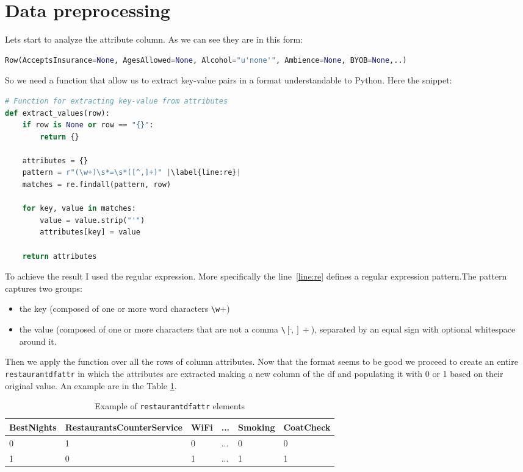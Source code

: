 \documentclass[12pt,english]{report}
\begin{document}
\section{Data preprocessing}
Lets start to analyze the attribute column. As we can see they are in this form:
\begin{lstlisting}[language={Python},label={lst:attritemex},caption={Attributes item example}]
Row(AcceptsInsurance=None, AgesAllowed=None, Alcohol="u'none'", Ambience=None, BYOB=None,..)
\end{lstlisting}
So we need a function that allow us to extract key-value pairs in a format understandable to Python. Here the snippet:
\begin{lstlisting}[language={Python},escapechar=|,label={lst:extractvalue},caption={Extracting key-value from attributes}]
# Function for extracting key-value from attributes
def extract_values(row):
    if row is None or row == "{}":
        return {}
    
    attributes = {}
    pattern = r"(\w+)\s*=\s*([^,]+)" |\label{line:re}|
    matches = re.findall(pattern, row)
    
    for key, value in matches:
        value = value.strip("'")
        attributes[key] = value
    
    return attributes
\end{lstlisting}
To achieve the result I used the regular expression. More specifically the line~\ref{line:re} defines a regular expression pattern.The pattern captures two groups:
\begin{itemize}
 \item the key (composed of one or more word characters \texttt{\textbackslash w$+$})
 \item the value (composed of one or more characters that are not a comma \texttt{\textbackslash $[\hat,]+$}), separated by an equal sign with optional whitespace around it.
 \end{itemize} 
Then we apply the function over all the rows of column attributes.
Now that the format seems to be good we proceed to create an entire \texttt{restaurant\textunderscore df\textunderscore attr} in which the attributes are extracted making a new column of the df and populating it with 0 or 1 based on their original value. An example are in the Table \ref{tab:restattrtable}.
\\
\begin{table}[]
\caption{Example of \texttt{restaurant\textunderscore df\textunderscore attr} elements} 
\label{tab:restattrtable}
\begin{tabular}{|l|l|l|l|l|l|}
\hline
BestNights & RestaurantsCounterService & WiFi & ... & Smoking & CoatCheck \\ \hline
0          & 1                         & 0    & ... & 0       & 0         \\ \hline
1          & 0                         & 1    & ... & 1       & 1         \\ \hline
\end{tabular}
\end{table}
\end{document}
